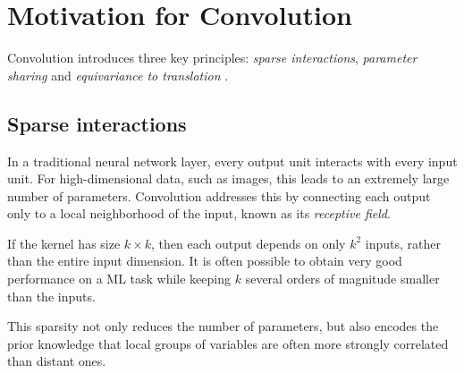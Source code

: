 \chapter{Motivation for Convolution}

Convolution introduces three key principles: \textit{sparse interactions}, \textit{parameter sharing} and \textit{equivariance to translation} \cite{goodfellow2016deep}.  

\section{Sparse interactions}

In a traditional neural network layer, every output unit interacts with every input unit.  
For high-dimensional data, such as images, this leads to an extremely large number of parameters.  
Convolution addresses this by connecting each output only to a local neighborhood of the input, known as its \textit{receptive field}.

If the kernel has size $k \times k$, then each output depends on only $k^2$ inputs, rather than the entire input dimension. It is often possible to obtain very good performance on a ML task while keeping $k$ several orders of magnitude smaller than the inputs.

\clearpage

This sparsity not only reduces the number of parameters, but also encodes the prior knowledge that local groups of variables are often more strongly correlated than distant ones.  

